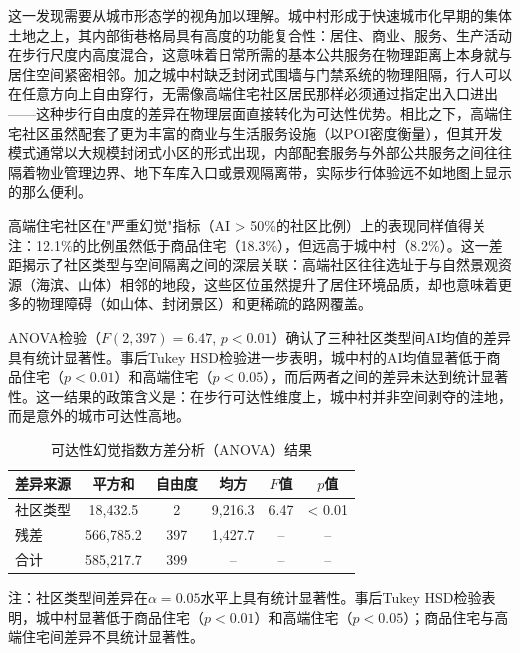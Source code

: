 \documentclass[10pt,conference]{IEEEtran}
\begin{document}
这一发现需要从城市形态学的视角加以理解。城中村形成于快速城市化早期的集体土地之上，其内部街巷格局具有高度的功能复合性：居住、商业、服务、生产活动在步行尺度内高度混合，这意味着日常所需的基本公共服务在物理距离上本身就与居住空间紧密相邻。加之城中村缺乏封闭式围墙与门禁系统的物理阻隔，行人可以在任意方向上自由穿行，无需像高端住宅社区居民那样必须通过指定出入口进出——这种步行自由度的差异在物理层面直接转化为可达性优势。相比之下，高端住宅社区虽然配套了更为丰富的商业与生活服务设施（以POI密度衡量），但其开发模式通常以大规模封闭式小区的形式出现，内部配套服务与外部公共服务之间往往隔着物业管理边界、地下车库入口或景观隔离带，实际步行体验远不如地图上显示的那么便利。

高端住宅社区在"严重幻觉"指标（AI > 50\%的社区比例）上的表现同样值得关注：12.1\%的比例虽然低于商品住宅（18.3\%），但远高于城中村（8.2\%）。这一差距揭示了社区类型与空间隔离之间的深层关联：高端社区往往选址于与自然景观资源（海滨、山体）相邻的地段，这些区位虽然提升了居住环境品质，却也意味着更多的物理障碍（如山体、封闭景区）和更稀疏的路网覆盖。

 ANOVA检验（$F(2, 397) = 6.47$, $p < 0.01$）确认了三种社区类型间AI均值的差异具有统计显著性。事后Tukey HSD检验进一步表明，城中村的AI均值显著低于商品住宅（$p < 0.01$）和高端住宅（$p < 0.05$），而后两者之间的差异未达到统计显著性。这一结果的政策含义是：在步行可达性维度上，城中村并非空间剥夺的洼地，而是意外的城市可达性高地。

\begin{table}[htbp]
\caption{可达性幻觉指数方差分析（ANOVA）结果}
\label{tab:anova}
\begin{center}
\begin{threeparttable}
\begin{tabular}{lccccc}
\toprule
差异来源 & 平方和 & 自由度 & 均方 & $F$值 & $p$值 \\
\midrule
社区类型 & 18,432.5 & 2 & 9,216.3 & 6.47 & < 0.01 \\
残差 & 566,785.2 & 397 & 1,427.7 & -- & -- \\
\midrule
合计 & 585,217.7 & 399 & -- & -- & -- \\
\bottomrule
\end{tabular}
\begin{tablenotes}
\item 注：社区类型间差异在$\alpha = 0.05$水平上具有统计显著性。事后Tukey HSD检验表明，城中村显著低于商品住宅（$p < 0.01$）和高端住宅（$p < 0.05$）；商品住宅与高端住宅间差异不具统计显著性。
\end{tablenotes}
\end{threeparttable}
\end{center}
\end{table}
\end{document}
